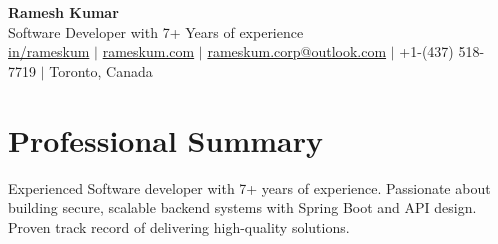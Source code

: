 \documentclass[a4paper, 10pt]{article}
\newcommand{\resumeItemNoSub}[1]{\item\small{{#1}}}
\newcommand{\resumeSubHeadingListStart}{\begin{itemize}[leftmargin=*]}
\newcommand{\resumeSubHeadingListEnd}{\end{itemize}}
\begin{document}
\begin{center}
  \textbf{\huge Ramesh Kumar} \\
  \vspace{2pt}
  Software Developer with 7+ Years of experience\\
  \vspace{2pt}
  \href{https:\\linkedin.com/in/rameskum}{\small \faLinkedin \hspace{2pt} in/rameskum}
  $\vert$
  \href{https:\\rameskum.com}{\small \faChain \hspace{1pt} rameskum.com}
  $\vert$
  \href{mailto:rameskum.corp@outlook.com}{\small \faEnvelope \hspace{2pt} rameskum.corp@outlook.com}
  $\vert$
  \faPhone \hspace{1pt} \small{ +1-(437) 518-7719}
  $\vert$
  \small \faMapMarker \hspace{2pt} \small{Toronto, Canada}\\
\end{center}

\small
\section{Professional Summary}

Experienced Software developer with 7+ years of experience. Passionate about building secure, scalable backend systems with Spring Boot and API design. Proven track record of delivering high-quality solutions.


\end{document}
